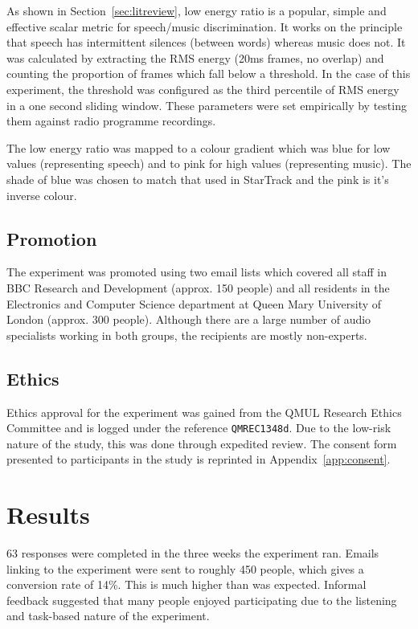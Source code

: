 As shown in Section~\ref{sec:litreview}, low energy ratio is a popular, simple
and effective scalar metric for speech/music discrimination. It works on the
principle that speech has intermittent silences (between words) whereas music
does not. It was calculated by extracting the RMS energy (20ms frames, no
overlap) and counting the proportion of frames which fall below a threshold.
In the case of this experiment, the threshold was configured as the third
percentile of RMS energy in a one second sliding window. These parameters were
set empirically by testing them against radio programme recordings.

The low energy ratio was mapped to a colour gradient which was blue for low
values (representing speech) and to pink for high values (representing music).
The shade of blue was chosen to match that used in StarTrack and the pink is
it's inverse colour.

\subsection{Promotion}\label{sec:promo}
The experiment was promoted using two email lists which covered all staff in
BBC Research and Development (approx. 150 people) and all residents in the
Electronics and Computer Science department at Queen Mary University of London
(approx. 300 people). Although there are a large number of audio specialists
working in both groups, the recipients are mostly non-experts.

\subsection{Ethics}
Ethics approval for the experiment was gained from the QMUL Research Ethics
Committee and is logged under the reference \texttt{QMREC1348d}. Due to the
low-risk nature of the study, this was done through expedited review. The
consent form presented to participants in the study is reprinted in
Appendix~\ref{app:consent}.

\section{Results}
63 responses were completed in the three weeks the experiment ran. Emails
linking to the experiment were sent to roughly 450 people, which gives a
conversion rate of 14\%. This is much higher than was expected.  Informal
feedback suggested that many people enjoyed participating due to the listening
and task-based nature of the experiment. 

